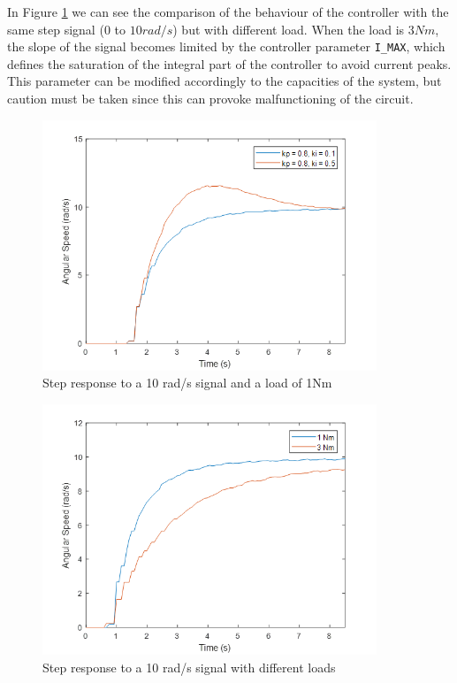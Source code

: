 \clearpage

In Figure \ref{fig:plot8} we can see the comparison of the behaviour of the controller with the same step signal ($0$ to $10 rad/s$) but with different load. When the load is $3 Nm$, the slope of the signal becomes limited by the controller parameter \texttt{I\_MAX}, which defines the saturation of the integral part of the controller to avoid current peaks. This parameter can be modified accordingly to the capacities of the system, but caution must be taken since this can provoke malfunctioning of the circuit.

\begin{figure}[h!p]
\centering
\includegraphics[width=10cm]{Images/plots/plot_8.png} 
\caption[plot8]{Step response to a 10 rad/s signal and a load of 1Nm}
\label{fig:plot8}
\end{figure}

\begin{figure}[h!p]
\centering
\includegraphics[width=10cm]{Images/plots/plot_9.png} 
\caption[plot9]{Step response to a 10 rad/s signal with different loads}
\label{fig:plot9}
\end{figure}

